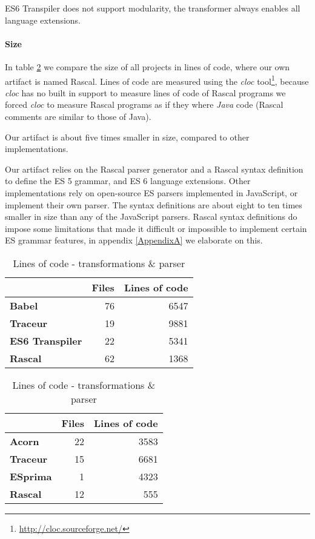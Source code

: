 ES6 Transpiler does not support modularity, the transformer always enables all language extensions.

\paragraph{Size}
In table \ref{tab:loc} we compare the size of all projects in lines of code, where our own artifact is named Rascal. Lines of code are measured using the \textit{cloc} tool\footnote{\url{http://cloc.sourceforge.net/}}, because \textit{cloc} has no built in support to measure lines of code of Rascal programs we forced \textit{cloc} to measure Rascal programs as if they where \textit{Java} code (Rascal comments are similar to those of Java).

Our artifact is about five times smaller in size, compared to other implementations. 

Our artifact relies on the Rascal parser generator and a Rascal syntax definition to define the ES 5 grammar, and ES 6 language extensions. Other implementations rely on open-source ES parsers implemented in JavaScript, or implement their own parser. The syntax definitions are about eight to ten times smaller in size than any of the JavaScript parsers. Rascal syntax definitions do impose some limitations that made it difficult or impossible to implement certain ES grammar features, in appendix \ref{AppendixA} we elaborate on this.

\begin{table}[h]
\caption{Lines of code - transformations \& parser} \label{tab:loc}
\begin{minipage}{0.45\linewidth}
\begin{tabular}{@{}lrr@{}}
\toprule
              & {\bf Files} & \multicolumn{1}{l}{{\bf Lines of code}} \\ \midrule
{\bf Babel}   & 76          & 6547                                    \\
{\bf Traceur} & 19          & 9881                                    \\
{\bf ES6 Transpiler} & 22    & 5341
\\
{\bf Rascal}  & 62          & 1368                                    \\ \bottomrule
\end{tabular}
\end{minipage}
\hfill
\begin{minipage}{0.45\linewidth}
\begin{tabular}{@{}lrr@{}}
\toprule
              & {\bf Files} & \multicolumn{1}{l}{{\bf Lines of code}} \\ \midrule
{\bf Acorn}   & 22          & 3583                                    \\
{\bf Traceur} & 15          & 6681                                    \\
{\bf ESprima} & 1           & 4323
\\
{\bf Rascal}  & 12          & 555                                    \\ \bottomrule
\end{tabular}
\end{minipage}
\end{table}

